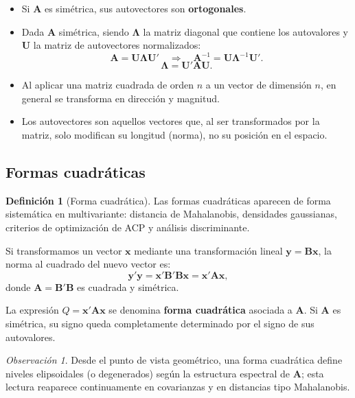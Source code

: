 \documentclass[12pt, a4paper]{article}
\theoremstyle{plain}
\theoremstyle{definition}
\newtheorem{definicion}[teorema]{Definición}
\theoremstyle{remark}
\newtheorem*{observacion}{Observación}
\newcommand{\mat}[1]{\mathbf{#1}}
\begin{document}
\begin{mdframed}[style=resultado]
\begin{itemize}
  \item Si $\mat{A}$ es simétrica, sus autovectores son \textbf{ortogonales}.
  \item Dada $\mat{A}$ simétrica, siendo $\mat{\Lambda}$ la matriz diagonal que
        contiene los autovalores y $\mat{U}$ la matriz de autovectores
        normalizados:
        \[
          \mat{A} = \mat{U}\mat{\Lambda}\mat{U}' \quad\Longrightarrow\quad
          \mat{A}^{-1} = \mat{U}\mat{\Lambda}^{-1}\mat{U}'.
        \]
        \[
          \mat{\Lambda} = \mat{U}'\mat{A}\mat{U}.
        \]
  \item Al aplicar una matriz cuadrada de orden $n$ a un vector de dimensión
        $n$, en general se transforma en dirección y magnitud.
  \item Los autovectores son aquellos vectores que, al ser transformados por la
        matriz, solo modifican su longitud (norma), no su posición en el espacio.
\end{itemize}
\end{mdframed}

\subsection{Formas cuadráticas}

\begin{definicion}[Forma cuadrática]
Las formas cuadráticas aparecen de forma sistemática en multivariante:
distancia de Mahalanobis, densidades gaussianas, criterios de optimización de
ACP y análisis discriminante.

Si transformamos un vector $\mathbf{x}$ mediante una transformación lineal
$\mathbf{y} = \mat{B}\mathbf{x}$, la norma al cuadrado del nuevo vector es:
\[
  \mathbf{y}'\mathbf{y} = \mathbf{x}'\mat{B}'\mat{B}\mathbf{x} = \mathbf{x}'\mat{A}\mathbf{x},
\]
donde $\mat{A} = \mat{B}'\mat{B}$ es cuadrada y simétrica.

La expresión $Q = \mathbf{x}'\mat{A}\mathbf{x}$ se denomina \textbf{forma
cuadrática} asociada a $\mat{A}$. Si $\mat{A}$ es simétrica, su signo queda
completamente determinado por el signo de sus autovalores.
\end{definicion}

\begin{observacion}
Desde el punto de vista geométrico, una forma cuadrática define niveles
elipsoidales (o degenerados) según la estructura espectral de $\mat{A}$; esta
lectura reaparece continuamente en covarianzas y en distancias tipo
Mahalanobis.
\end{observacion}
\end{document}
